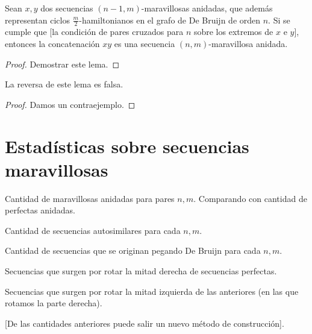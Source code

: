 \documentclass[11pt]{article}
\begin{document}
\begin{lema}
	Sean $x, y$ dos secuencias $(n - 1, m)$-maravillosas anidadas, que además representan ciclos $\frac{m}{2}$-hamiltonianos en el grafo de De Bruijn de orden $n$. Si se cumple que [la condición de pares cruzados para $n$ sobre los extremos de $x$ e $y$], entonces la concatenación
	$xy$ es una secuencia $(n, m)$-maravillosa anidada.
\end{lema}

\begin{proof}
	Demostrar este lema.
\end{proof}

\begin{prop}
	La reversa de este lema es falsa.
\end{prop}

\begin{proof}
	Damos un contraejemplo.
\end{proof}

\section{Estadísticas sobre secuencias maravillosas}

Cantidad de maravillosas anidadas para pares $n, m$. Comparando con cantidad de perfectas anidadas.

Cantidad de secuencias autosimilares para cada $n, m$.

Cantidad de secuencias que se originan pegando De Bruijn para cada $n, m$.

Secuencias que surgen por rotar la mitad derecha de secuencias perfectas.

Secuencias que surgen por rotar la mitad izquierda de las anteriores (en las que rotamos la parte derecha).

	[De las cantidades anteriores puede salir un nuevo método de construcción].

{}

\end{document}
